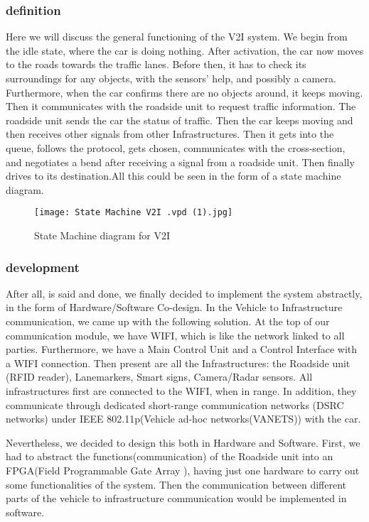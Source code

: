 \documentclass[conference]{IEEEtran}
\begin{document}
\subsubsection{definition}
Here we will discuss the general functioning of the V2I system. We begin from the idle state, where the car is doing nothing. After activation, the car now moves to the roads towards the traffic lanes. Before then, it has to check its surroundings for any objects, with the sensors' help, and possibly a camera. Furthermore, when the car confirms there are no objects around, it keeps moving. Then it communicates with the roadside unit to request traffic information. The roadside unit sends the car the status of traffic. Then the car keeps moving and then receives other signals from other Infrastructures. Then it gets into the queue, follows the protocol, gets chosen, communicates with the cross-section, and negotiates a bend after receiving a signal from a roadside unit. Then finally drives to its destination.All this could be seen in the form of a state machine diagram.

\begin{figure}[htp]
    \centering
    \texttt{[image: State Machine V2I .vpd (1).jpg]}
    \caption{State Machine diagram for V2I}
    \label{fig:reg-gen}
\end{figure}

\subsubsection{development}
After all, is said and done, we finally decided to implement the system abstractly, in the form of Hardware/Software Co-design. In the Vehicle to Infrastructure communication, we came up with the following solution. At the top of our communication module, we have WIFI, which is like the network linked to all parties. Furthermore, we have a Main Control Unit and a Control Interface with a WIFI connection. Then present are all the Infrastructures: the Roadside unit (RFID reader), Lanemarkers, Smart signs, Camera/Radar sensors. All infrastructures first are connected to the WIFI, when in range. In addition, they communicate through dedicated short-range communication networks (DSRC networks) under IEEE 802.11p(Vehicle ad-hoc networks(VANETS)) with the car.


Nevertheless, we decided to design this both in Hardware and Software. First, we had to abstract the functions(communication) of the Roadside unit into an FPGA(Field Programmable Gate Array ), having just one hardware to carry out some functionalities of the system. Then the communication between different parts of the vehicle to infrastructure communication would be implemented in software. 
\end{document}
